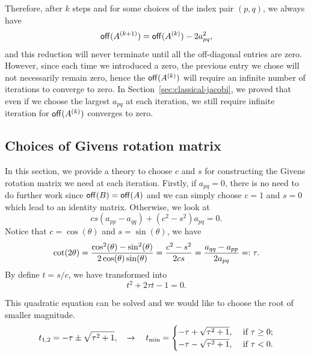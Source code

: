 Therefore, after $k$ steps and for some choices of the index pair $(p,q)$, we always have 
\begin{equation}\notag
  \mathsf{off}(A^{(k+1)}) = \mathsf{off}(A^{(k)}) - 2a_{pq}^2,
\end{equation}
and this reduction will never terminate until all the off-diagonal entries are zero. However, since each time we introduced a zero, the previous entry we chose will not necessarily remain zero, hence the $\mathsf{off}(A^{(k)})$ will require an infinite number of iterations to converge to zero. In Section~\ref{sec:classical-jacobi}, we proved that even if we choose the largest $a_{pq}$ at each iteration, we still require infinite iteration for $\mathsf{off}(A^{(k)})$ converges to zero.

\subsection{Choices of Givens rotation matrix}\label{sec:2.3}

In this section, we provide a theory to choose $c$ and $s$ for constructing the Givens rotation matrix we need at each iteration. Firstly, if $a_{pq}=0$, there is no need to do further work since $\mathsf{off}(B) = \mathsf{off}(A)$ and we can simply choose $c = 1$ and $s = 0$ which lead to an identity matrix. Otherwise, we look at 
\begin{equation}
  \label{eq:sec:3.1.1_equality}
    cs(a_{pp}-a_{qq}) + (c^2 -s^2)a_{pq} = 0. \tag{3.6}
\end{equation}
Notice that $c = \cos(\theta)$ and $s = \sin(\theta)$, we have 
\begin{equation}\notag
    \label{2.9}
    \cot(2\theta) = \frac{\cos^2(\theta) - \sin^2(\theta)}{2\cos(\theta)\sin(\theta)} = \frac{c^2 - s^2 }{2cs} = \frac{a_{qq}-a_{pp}}{2a_{pq}} =:\tau.
\end{equation}
By define $t = s/c$, we have transformed  into 
\begin{equation}\label{eq:2.10}
    t^2 + 2\tau t - 1 = 0.
\end{equation}

This quadratic equation can be solved and we would like to choose the root of smaller magnitude.
\begin{equation}\notag
    t_{1,2} = -\tau \pm \sqrt{\tau^2 + 1},\quad \to \quad t_{\mathrm{min}} = 
    \begin{cases}
        -\tau + \sqrt{\tau^2 + 1}, & \text{ if } \tau\geq 0 ; \\
        -\tau - \sqrt{\tau^2 + 1}, & \text{ if } \tau < 0.
    \end{cases}
\end{equation}

